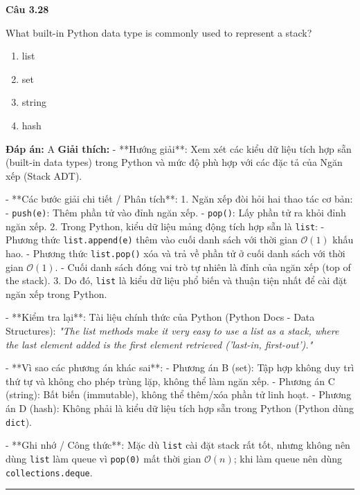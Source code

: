\documentclass[11pt,a4paper]{article}
\newenvironment{question}[1]{%
  \par\vspace{1em}\noindent\textbf{\large Câu #1}\par\vspace{0.4em}
}{%
  \par\vspace{1em}\hrule\vspace{0.6em}
}
\newenvironment{choices}{%
  \begin{enumerate}[label=\textbf{\Alph*.},leftmargin=2.2em,itemsep=2pt,topsep=3pt]
}{%
  \end{enumerate}
}
\newcommand{\choice}{\item}
\begin{document}
\begin{question}{3.28}
What built-in Python data type is commonly used to represent a stack?
\begin{choices}
\choice list
\choice set
\choice string
\choice hash
\end{choices}
\textbf{Đáp án:} A
\textbf{Giải thích:} - **Hướng giải**:
Xem xét các kiểu dữ liệu tích hợp sẵn (built-in data types) trong Python và mức độ phù hợp với các đặc tả của Ngăn xếp (Stack ADT).


- **Các bước giải chi tiết / Phân tích**:
1. Ngăn xếp đòi hỏi hai thao tác cơ bản:
   - \texttt{push(e)}: Thêm phần tử vào đỉnh ngăn xếp.
   - \texttt{pop()}: Lấy phần tử ra khỏi đỉnh ngăn xếp.
2. Trong Python, kiểu dữ liệu mảng động tích hợp sẵn là \texttt{list}:
   - Phương thức \texttt{list.append(e)} thêm vào cuối danh sách với thời gian \(\mathcal{O}(1)\) khấu hao.
   - Phương thức \texttt{list.pop()} xóa và trả về phần tử ở cuối danh sách với thời gian \(\mathcal{O}(1)\).
   - Cuối danh sách đóng vai trò tự nhiên là đỉnh của ngăn xếp (top of the stack).
3. Do đó, \texttt{list} là kiểu dữ liệu phổ biến và thuận tiện nhất để cài đặt ngăn xếp trong Python.


- **Kiểm tra lại**:
Tài liệu chính thức của Python (Python Docs - Data Structures): \textit{"The list methods make it very easy to use a list as a stack, where the last element added is the first element retrieved ('last-in, first-out')."}


- **Vì sao các phương án khác sai**:
- Phương án B (set): Tập hợp không duy trì thứ tự và không cho phép trùng lặp, không thể làm ngăn xếp.
- Phương án C (string): Bất biến (immutable), không thể thêm/xóa phần tử linh hoạt.
- Phương án D (hash): Không phải là kiểu dữ liệu tích hợp sẵn trong Python (Python dùng \texttt{dict}).


- **Ghi nhớ / Công thức**:
Mặc dù \texttt{list} cài đặt stack rất tốt, nhưng không nên dùng \texttt{list} làm queue vì \texttt{pop(0)} mất thời gian \(\mathcal{O}(n)\); khi làm queue nên dùng \texttt{collections.deque}.
\end{question}
\end{document}
